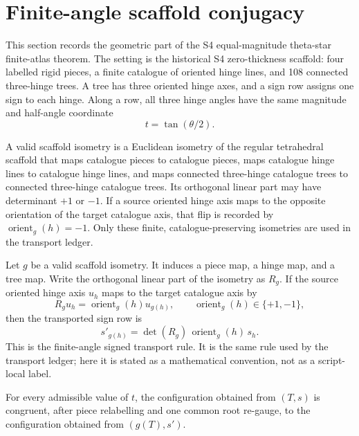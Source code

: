 
\section{Finite-angle scaffold conjugacy}

This section records the geometric part of the S4 equal-magnitude theta-star finite-atlas theorem.  The setting is the historical S4 zero-thickness scaffold: four labelled rigid pieces, a finite catalogue of oriented hinge lines, and 108 connected three-hinge trees.  A tree has three oriented hinge axes, and a sign row assigns one sign to each hinge.  Along a row, all three hinge angles have the same magnitude and half-angle coordinate
\[
  t = \tan(\theta/2).
\]

\begin{definition}
A valid scaffold isometry is a Euclidean isometry of the regular tetrahedral scaffold that maps catalogue pieces to catalogue pieces, maps catalogue hinge lines to catalogue hinge lines, and maps connected three-hinge catalogue trees to connected three-hinge catalogue trees.  Its orthogonal linear part may have determinant \(+1\) or \(-1\).  If a source oriented hinge axis maps to the opposite orientation of the target catalogue axis, that flip is recorded by \(\operatorname{orient}_g(h)=-1\).  Only these finite, catalogue-preserving isometries are used in the transport ledger.
\end{definition}

Let \(g\) be a valid scaffold isometry.  It induces a piece map, a hinge map, and a tree map.  Write the orthogonal linear part of the isometry as \(R_g\).  If the source oriented hinge axis \(u_h\) maps to the target catalogue axis by
\[
  R_g u_h = \operatorname{orient}_g(h) u_{g(h)},
  \qquad \operatorname{orient}_g(h) \in \{+1,-1\},
\]
then the transported sign row is
\[
  s'_{g(h)} = \det(R_g)\, \operatorname{orient}_g(h)\, s_h .
\]
This is the finite-angle signed transport rule.  It is the same rule used by the transport ledger; here it is stated as a mathematical convention, not as a script-local label.

\begin{lemma}
For every admissible value of \(t\), the configuration obtained from \((T,s)\) is congruent, after piece relabelling and one common root re-gauge, to the configuration obtained from \((g(T),s')\).
\end{lemma}

